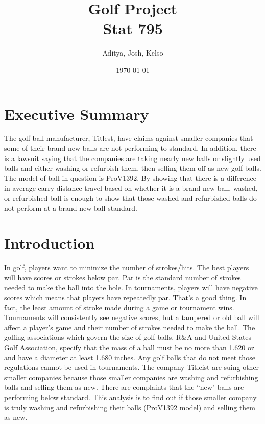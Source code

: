 \documentclass{article}\usepackage[]{graphicx}\usepackage[]{color}
\title{Golf Project \\
\large Stat 795}
\author{Aditya, Josh, Kelso}
\date{\today}
\makeatletter
\newcommand{\doublespacing}{\let\CS=\@currsize\renewcommand{
		\baselinestretch}{1.2}\small\CS}
\makeatother
\begin{document}
 
\maketitle




\doublespacing

\centering
\section*{Executive Summary}


The golf ball manufacturer, Titlest, have claims against smaller companies that some of their brand new balls are not performing to standard. In addition, there is a lawsuit saying that the companies are taking nearly new balls or slightly used balls and either washing or refurbish them, then selling them off as new golf balls. The model of ball in question is ProV1392. By showing that there is a difference in average carry distance travel based on whether it is a brand new ball, washed, or refurbished ball is enough to show that those washed and refurbished balls do not perform at a brand new ball standard.

\section*{Introduction}

In golf, players want to minimize the number of strokes/hits. The best players will have scores or strokes below par. Par is the standard number of strokes needed to make the ball into the hole. In tournaments, players will have negative scores which means that players have repeatedly par. That’s a good thing. In fact, the least amount of stroke made during a game or tournament wins. Tournaments will consistently see negative scores, but a tampered or old ball will affect a player’s game and their number of strokes needed to make the ball.   
The golfing associations which govern the size of golf balls, R\&A and United States Golf Association, specify that the mass of a ball must be no more than 1.620 oz and have a diameter at least 1.680 inches. Any golf balls that do not meet those regulations cannot be used in tournaments. The company Titleist are suing other smaller companies because those smaller companies are washing and refurbishing balls and selling them as new. There are complaints that the ``new" balls are performing below standard. This analysis is to find out if those smaller company is truly washing and refurbishing their balls (ProV1392 model) and selling them as new. 
\end{document}
